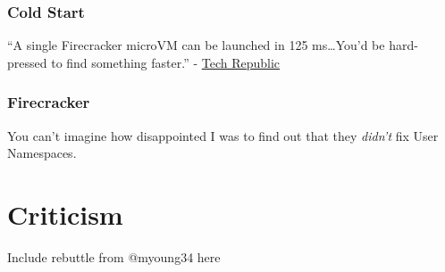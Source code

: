 \documentclass{beamer}
\begin{document}
\begin{frame}
	\frametitle{Cold Start}
	``A single Firecracker microVM can be launched in \alert{125 ms}\ldots You'd be
	hard-pressed to find something faster.''
	- \href{https://www.techrepublic.com/article/aws-firecracker-10-things-every-tech-pro-should-know/}{Tech Republic}
\end{frame}

\begin{frame}
	\frametitle{Firecracker}
	You can't imagine how disappointed I was to find out that they \emph{didn't} fix
	User Namespaces.
\end{frame}
 
\section{Criticism}
\frame{\sectionpage}

\begin{frame}
	Include rebuttle from @myoung34 here
\end{frame}
\end{document}
